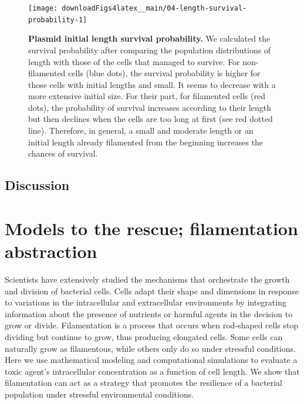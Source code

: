 \documentclass[a4paper, nobind]{templates/ociamthesis}
\begin{document}
\begin{figure}[H]
\texttt{[image: downloadFigs4latex\_\_main/04-length-survival-probability-1]} \caption[Plasmid initial length survival probability.]{\textbf{Plasmid initial length survival probability.} We calculated the survival probability after comparing the population distributions of length with those of the cells that managed to survive. For non-filamented cells (blue dots), the survival probability is higher for those cells with initial lengths and small. It seems to decrease with a more extensive initial size. For their part, for filamented cells (red dots), the probability of survival increases according to their length but then declines when the cells are too long at first (see red dotted line). Therefore, in general, a small and moderate length or an initial length already filamented from the beginning increases the chances of survival.}\label{fig:04-length-survival-probability-1}
\end{figure}

\hypertarget{discussion}{%
\section{Discussion}\label{discussion}}

\hypertarget{filamentation-abstraction}{%
\chapter{Models to the rescue; filamentation abstraction}\label{filamentation-abstraction}}

\minitoc 

\noindent Scientists have extensively studied the mechanisms that orchestrate the growth and division of bacterial cells. Cells adapt their shape and dimensions in response to variations in the intracellular and extracellular environments by integrating information about the presence of nutrients or harmful agents in the decision to grow or divide. Filamentation is a process that occurs when rod-shaped cells stop dividing but continue to grow, thus producing elongated cells. Some cells can naturally grow as filamentous, while others only do so under stressful conditions. Here we use mathematical modeling and computational simulations to evaluate a toxic agent's intracellular concentration as a function of cell length. We show that filamentation can act as a strategy that promotes the resilience of a bacterial population under stressful environmental conditions.
\end{document}
